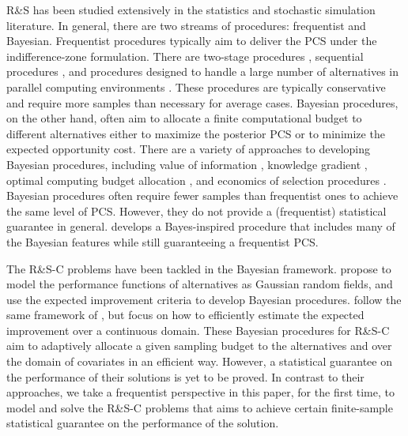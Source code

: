 \documentclass[ijoc,nonblindrev]{informs3}
\begin{document}
R\&S has been studied extensively in the statistics and stochastic simulation literature.
In general, there are two streams  of procedures: frequentist and Bayesian.
Frequentist procedures typically aim to deliver the PCS under the indifference-zone formulation.
There are two-stage procedures \citep{rinott1978}, sequential procedures \citep{kim2001, hong2006}, and procedures designed to handle a large number of alternatives in parallel computing environments \citep{luo2015, ni2017efficient}.
These procedures are typically conservative and require more samples than necessary for average cases.
Bayesian procedures, on the other hand, often aim to allocate a finite computational budget to different alternatives either to maximize the posterior PCS or to minimize the expected opportunity cost.
There are a variety of approaches to developing Bayesian procedures, including value of information \citep{chick2001OR}, knowledge gradient \citep{frazier2008}, optimal computing budget allocation \citep{ChenChenDaiYucesan97}, and economics of selection procedures \citep{ChickGans09,chick2012}.
Bayesian procedures often require fewer samples than frequentist ones to achieve the same level of PCS.
However, they do not provide a (frequentist) statistical guarantee in general.
\cite{Frazier14} develops a Bayes-inspired procedure that includes many of the Bayesian features while still guaranteeing a frequentist PCS.


The R\&S-C problems have been tackled in the Bayesian framework.
\cite{hu2017sequential} propose to model the performance functions of alternatives as Gaussian random fields, and use the expected improvement criteria to develop Bayesian procedures.
\cite{pearce2017efficient} follow the same framework of \cite{hu2017sequential}, but focus on how to efficiently estimate the expected improvement over a continuous domain.
These Bayesian procedures for R\&S-C aim to adaptively allocate a given sampling budget to the alternatives and over the domain of covariates in an efficient way. However, a statistical guarantee on the performance of their solutions is yet to be proved.
In contrast to their approaches, we take a frequentist perspective in this paper, for the first time, to model and solve the R\&S-C problems
that aims to achieve certain finite-sample statistical guarantee on the performance of the solution.
\end{document}
